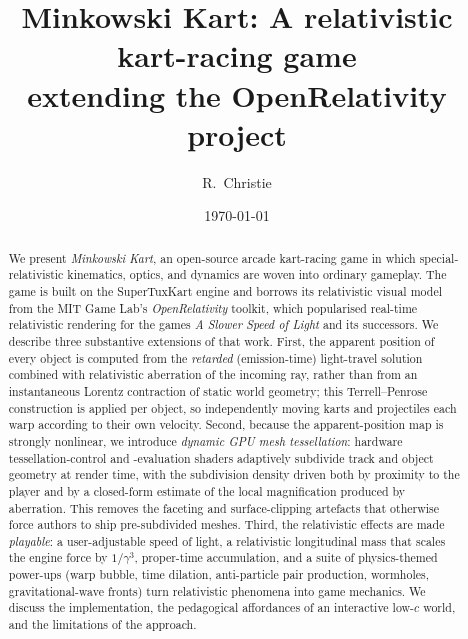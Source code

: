 \documentclass[aip,amsmath,amssymb,reprint,nofootinbib]{revtex4-2}
\begin{document}
\title{Minkowski Kart: A relativistic kart-racing game\\ extending the OpenRelativity project}

\author{R.~Christie}

\date{\today}

\begin{abstract}
We present \emph{Minkowski Kart}, an open-source arcade kart-racing game in which
special-relativistic kinematics, optics, and dynamics are woven into ordinary
gameplay. The game is built on the SuperTuxKart engine and borrows its
relativistic visual model from the MIT Game Lab's \emph{OpenRelativity} toolkit,
which popularised real-time relativistic rendering for the games \emph{A Slower
Speed of Light} and its successors. We describe three substantive extensions of
that work. First, the apparent position of every object is computed from the
\emph{retarded} (emission-time) light-travel solution combined with relativistic
aberration of the incoming ray, rather than from an instantaneous Lorentz
contraction of static world geometry; this Terrell--Penrose construction is
applied per object, so independently moving karts and projectiles each warp
according to their own velocity. Second, because the apparent-position map is
strongly nonlinear, we introduce \emph{dynamic GPU mesh tessellation}: hardware
tessellation-control and -evaluation shaders adaptively subdivide track and
object geometry at render time, with the subdivision density driven both by
proximity to the player and by a closed-form estimate of the local magnification
produced by aberration. This removes the faceting and surface-clipping artefacts
that otherwise force authors to ship pre-subdivided meshes. Third, the
relativistic effects are made \emph{playable}: a user-adjustable speed of light,
a relativistic longitudinal mass that scales the engine force by $1/\gamma^3$,
proper-time accumulation, and a suite of physics-themed power-ups (warp bubble,
time dilation, anti-particle pair production, wormholes, gravitational-wave
fronts) turn relativistic phenomena into game mechanics. We discuss the
implementation, the pedagogical affordances of an interactive low-$c$ world, and
the limitations of the approach.
\end{abstract}

\maketitle
\end{document}
